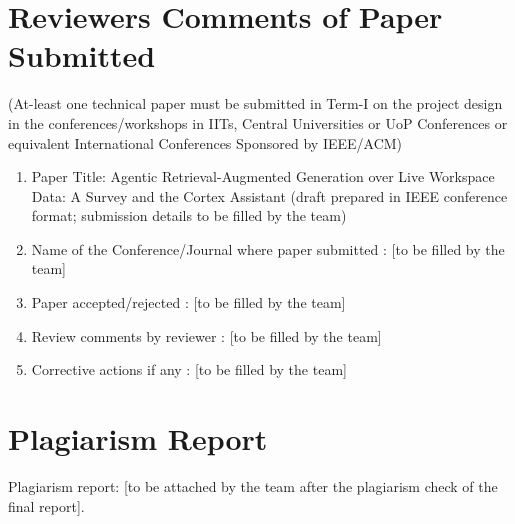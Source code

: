 \documentclass[oneside,a4paper,12pt]{report}
\begin{document}
\begin{appendices}
\chapter{Reviewers Comments of Paper Submitted}
(At-least one technical paper must be submitted in Term-I on the project design in the
conferences/workshops in IITs, Central Universities or UoP Conferences or equivalent International Conferences Sponsored by IEEE/ACM)
\begin{enumerate}
\item Paper Title: Agentic Retrieval-Augmented Generation over Live Workspace Data: A Survey and the Cortex Assistant (draft prepared in IEEE conference format; submission details to be filled by the team)
\item Name of the Conference/Journal where paper submitted : [to be filled by the team]
\item Paper accepted/rejected : [to be filled by the team]
\item Review comments by reviewer : [to be filled by the team]
\item Corrective actions if any : [to be filled by the team]

\end{enumerate}

\chapter{Plagiarism Report}
Plagiarism report: [to be attached by the team after the plagiarism check of the final report].

\end{appendices}
\end{document}
